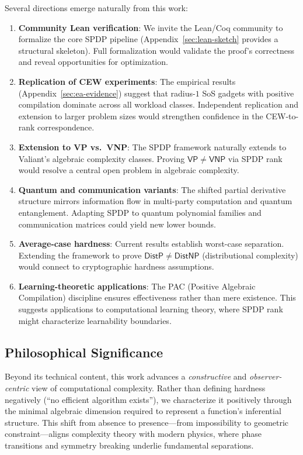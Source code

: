 \documentclass[12pt]{article}
\theoremstyle{definition}
\theoremstyle{definition}
\theoremstyle{remark}
\theoremstyle{remark}
\begin{document}
Several directions emerge naturally from this work:
\begin{enumerate}
\item \textbf{Community Lean verification}: We invite the Lean/Coq community to formalize the core SPDP pipeline (Appendix~\ref{sec:lean-sketch} provides a structural skeleton). Full formalization would validate the proof's correctness and reveal opportunities for optimization.

\item \textbf{Replication of CEW experiments}: The empirical results (Appendix~\ref{sec:ea-evidence}) suggest that radius-$1$ SoS gadgets with positive compilation dominate across all workload classes. Independent replication and extension to larger problem sizes would strengthen confidence in the CEW-to-rank correspondence.

\item \textbf{Extension to VP vs.\ VNP}: The SPDP framework naturally extends to Valiant's algebraic complexity classes. Proving $\mathsf{VP} \neq \mathsf{VNP}$ via SPDP rank would resolve a central open problem in algebraic complexity.

\item \textbf{Quantum and communication variants}: The shifted partial derivative structure mirrors information flow in multi-party computation and quantum entanglement. Adapting SPDP to quantum polynomial families and communication matrices could yield new lower bounds.

\item \textbf{Average-case hardness}: Current results establish worst-case separation. Extending the framework to prove $\mathsf{DistP} \neq \mathsf{DistNP}$ (distributional complexity) would connect to cryptographic hardness assumptions.

\item \textbf{Learning-theoretic applications}: The PAC (Positive Algebraic Compilation) discipline ensures effectiveness rather than mere existence. This suggests applications to computational learning theory, where SPDP rank might characterize learnability boundaries.
\end{enumerate}

\subsection{Philosophical Significance}

Beyond its technical content, this work advances a \emph{constructive} and \emph{observer-centric} view of computational complexity. Rather than defining hardness negatively (``no efficient algorithm exists''), we characterize it positively through the minimal algebraic dimension required to represent a function's inferential structure. This shift from absence to presence---from impossibility to geometric constraint---aligns complexity theory with modern physics, where phase transitions and symmetry breaking underlie fundamental separations.
\end{document}
